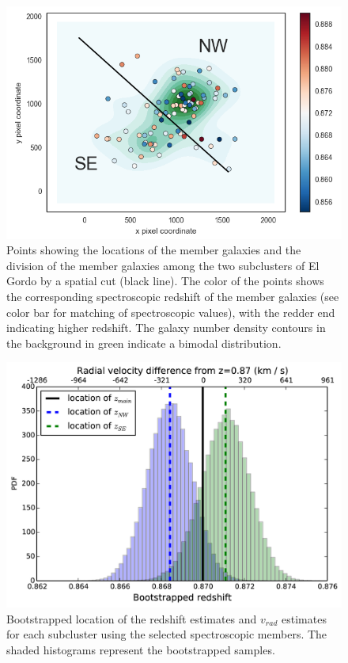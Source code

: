 \documentclass[letterpaper,useAMS,usenatbib]{mn2e}
\begin{document}
\begin{figure}
	\includegraphics[width = \linewidth]{confirmed_member_divide.png}
	\caption{\label{fig:membership} Points showing the locations of the
	member galaxies and the division of the member galaxies among the two subclusters of El Gordo by a spatial cut
(black line). The color of the points shows the corresponding spectroscopic
redshift of the member galaxies (see color bar for matching of
spectroscopic values), with the redder end indicating higher
redshift. The galaxy number density contours in the background in green indicate a bimodal
distribution.} 
\end{figure}
\begin{figure}
	\includegraphics[width = \linewidth]{bootstrapped_redshift.png}
	\caption{Bootstrapped location of the
	redshift estimates and $v_{rad}$ estimates for each subcluster using the
	selected spectroscopic members. The shaded histograms represent the
	bootstrapped samples.
} \label{fig:bootstrap_redshift}
\end{figure}
\end{document}
